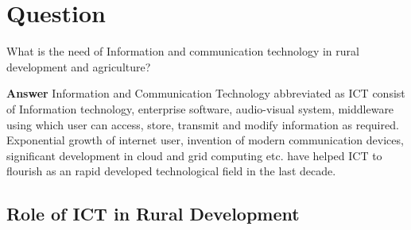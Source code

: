 \documentclass[11pt,largemargins]{homework}
\begin{document}
\maketitle

\section{Question}
  What is the need of Information and communication technology in rural development and agriculture?

 


\textbf{Answer}
Information and Communication Technology abbreviated as ICT consist of Information technology, enterprise software, audio-visual system, middleware using which user can access, store, transmit and modify information as required. Exponential growth of internet user, invention of modern communication devices, significant development in cloud and grid computing etc. have helped ICT to flourish as an rapid developed technological field in the last decade. \\

\subsection{Role of ICT in Rural Development}
\end{document}
